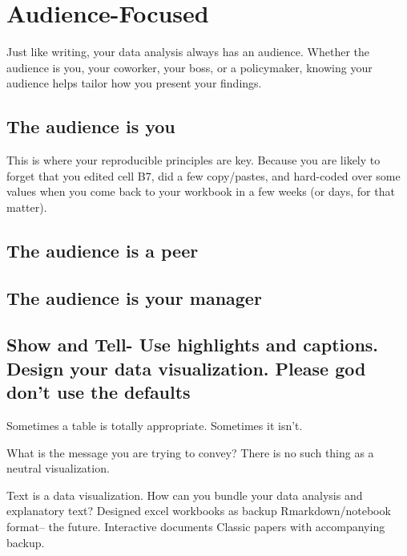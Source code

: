 \documentclass[]{book}
\begin{document}
\hypertarget{audience-focused}{%
\chapter{Audience-Focused}\label{audience-focused}}

Just like writing, your data analysis always has an audience. Whether the audience is you, your coworker, your boss, or a policymaker, knowing your audience helps tailor how you present your findings.

\hypertarget{the-audience-is-you}{%
\section{The audience is you}\label{the-audience-is-you}}

This is where your reproducible principles are key. Because you are likely to forget that you edited cell B7, did a few copy/pastes, and hard-coded over some values when you come back to your workbook in a few weeks (or days, for that matter).

\hypertarget{the-audience-is-a-peer}{%
\section{The audience is a peer}\label{the-audience-is-a-peer}}

\hypertarget{the-audience-is-your-manager}{%
\section{The audience is your manager}\label{the-audience-is-your-manager}}

\hypertarget{show-and-tell--use-highlights-and-captions.-design-your-data-visualization.-please-god-dont-use-the-defaults}{%
\section{Show and Tell- Use highlights and captions. Design your data visualization. Please god don't use the defaults}\label{show-and-tell--use-highlights-and-captions.-design-your-data-visualization.-please-god-dont-use-the-defaults}}

Sometimes a table is totally appropriate. Sometimes it isn't.

What is the message you are trying to convey? There is no such thing as a neutral visualization.

Text is a data visualization. How can you bundle your data analysis and explanatory text?
Designed excel workbooks as backup
Rmarkdown/notebook format-- the future.
Interactive documents
Classic papers with accompanying backup.
\end{document}
